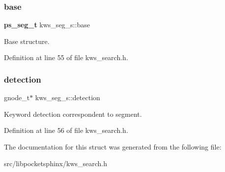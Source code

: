 \subsubsection{base}
{\footnotesize\ttfamily \textbf{ ps\+\_\+seg\+\_\+t} kws\+\_\+seg\+\_\+s\+::base}



Base structure. 



Definition at line 55 of file kws\+\_\+search.\+h.

\mbox{\label{structkws__seg__s_a5de99d98b2be6e0348033c9fc05ec139}} 
\subsubsection{detection}
{\footnotesize\ttfamily gnode\+\_\+t$\ast$ kws\+\_\+seg\+\_\+s\+::detection}



Keyword detection correspondent to segment. 



Definition at line 56 of file kws\+\_\+search.\+h.



The documentation for this struct was generated from the following file\+:\begin{DoxyCompactItemize}
\item 
src/libpocketsphinx/kws\+\_\+search.\+h\end{DoxyCompactItemize}
